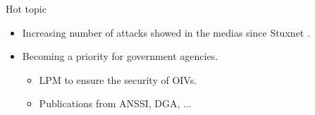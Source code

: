 \documentclass{beamer}
\begin{document}
\begin{frame}
\begin{columns}
\begin{column}{.3\textwidth}
{            }
        \end{column}
        \begin{column}{.3\textwidth}
        \end{column}
    \end{columns}
    
    \begin{block}{Hot topic}
        \begin{itemize}
            \item Increasing number of attacks showed in the medias since Stuxnet \cite{Lan11}.
            \item Becoming a priority for government agencies.
            \begin{itemize}
                \item LPM to ensure the security of OIVs.
                \item Publications from ANSSI, DGA, ...
            \end{itemize}
        \end{itemize}
    \end{block}
\end{frame}
\end{document}
